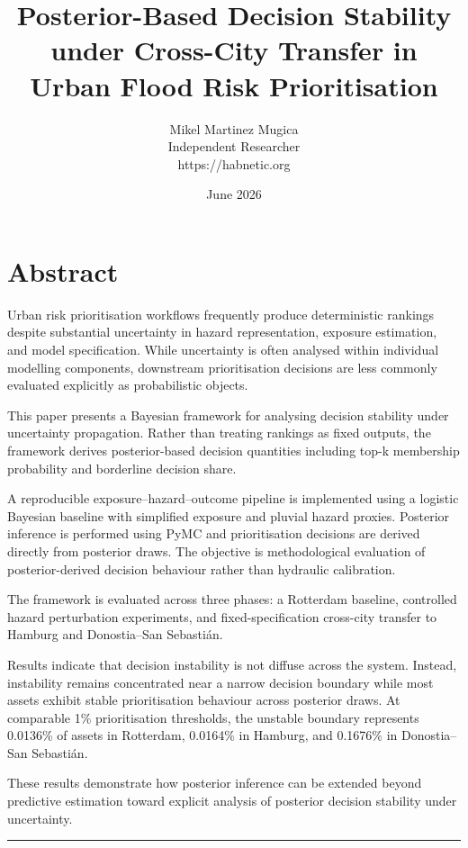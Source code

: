 \documentclass[
]{article}
\title{Posterior-Based Decision Stability under Cross-City Transfer in
Urban Flood Risk Prioritisation}
\author{Mikel Martinez Mugica\\
Independent Researcher\\
https://habnetic.org}
\date{June 2026}
\begin{document}
\maketitle

{
\setcounter{tocdepth}{3}
\tableofcontents
}
\section{Abstract}\label{abstract}

Urban risk prioritisation workflows frequently produce deterministic
rankings despite substantial uncertainty in hazard representation,
exposure estimation, and model specification. While uncertainty is often
analysed within individual modelling components, downstream
prioritisation decisions are less commonly evaluated explicitly as
probabilistic objects.

This paper presents a Bayesian framework for analysing decision
stability under uncertainty propagation. Rather than treating rankings
as fixed outputs, the framework derives posterior-based decision
quantities including top-k membership probability and borderline
decision share.

A reproducible exposure–hazard–outcome pipeline is implemented using a
logistic Bayesian baseline with simplified exposure and pluvial hazard
proxies. Posterior inference is performed using PyMC and prioritisation
decisions are derived directly from posterior draws. The objective is
methodological evaluation of posterior-derived decision behaviour rather
than hydraulic calibration.

The framework is evaluated across three phases: a Rotterdam baseline,
controlled hazard perturbation experiments, and fixed-specification
cross-city transfer to Hamburg and Donostia–San Sebastián.

Results indicate that decision instability is not diffuse across the
system. Instead, instability remains concentrated near a narrow decision
boundary while most assets exhibit stable prioritisation behaviour
across posterior draws. At comparable 1\% prioritisation thresholds, the
unstable boundary represents 0.0136\% of assets in Rotterdam, 0.0164\%
in Hamburg, and 0.1676\% in Donostia–San Sebastián.

These results demonstrate how posterior inference can be extended beyond
predictive estimation toward explicit analysis of posterior decision
stability under uncertainty.

\begin{center}\rule{0.5\linewidth}{0.5pt}\end{center}
\end{document}
